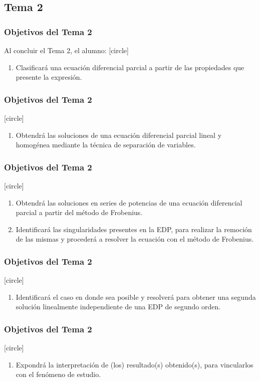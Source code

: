 \documentclass[12pt]{beamer}
\begin{document}
\subsection{Tema 2}
\begin{frame}
\frametitle{Objetivos del Tema 2}
Al concluir el Tema 2, el alumno:
[circle]
\begin{enumerate}
\item Clasificará una ecuación diferencial parcial a partir de las propiedades que presente la expresión.
\seti
\end{enumerate}
\end{frame}
\begin{frame}
\frametitle{Objetivos del Tema 2}
[circle]
\begin{enumerate}
\conti
\item Obtendrá las soluciones de una ecuación diferencial parcial lineal y homogénea mediante la técnica de separación de variables.
\seti
\end{enumerate}
\end{frame}
\begin{frame}
\frametitle{Objetivos del Tema 2}
[circle]
\begin{enumerate}
\conti
\item Obtendrá las soluciones en series de potencias de una ecuación diferencial parcial a partir del método de Frobenius.
\item Identificará las singularidades presentes en la EDP, para realizar la remoción de las mismas y procederá a resolver la ecuación con el método de Frobenius.
\seti
\end{enumerate}
\end{frame}
\begin{frame}
\frametitle{Objetivos del Tema 2}
[circle]
\begin{enumerate}
\conti
\item Identificará el caso en donde sea posible y resolverá para obtener una segunda solución linealmente independiente de una EDP de segundo orden.
\seti
\end{enumerate}
\end{frame}
\begin{frame}
\frametitle{Objetivos del Tema 2}
[circle]
\begin{enumerate}
\conti
\item Expondrá la interpretación de (los) resultado(s) obtenido(s), para vincularlos con el fenómeno de estudio.
\seti
\end{enumerate}
\end{frame}
\end{document}
